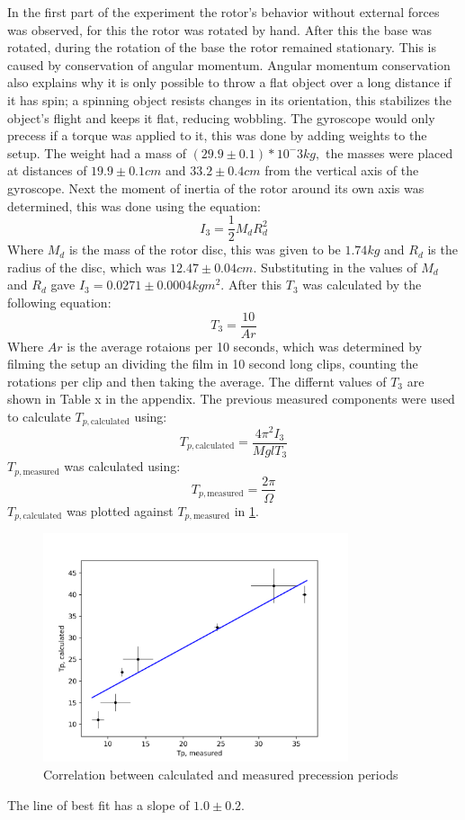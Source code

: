 In the first part of the experiment the rotor’s behavior without external forces was observed, for this the rotor was rotated by hand. After this the base was rotated, during the rotation of the base the rotor remained stationary. This is caused by conservation of angular momentum. Angular momentum conservation also explains why it is only possible to throw a flat object over a long distance if it has spin; a spinning object resists changes in its orientation, this stabilizes the object's flight and keeps it flat, reducing wobbling.
The gyroscope would only precess if a torque was applied to it, this was done by adding weights to the setup. The weight had a mass of $(29.9 \pm 0.1)*10^-3 kg,$ the masses were placed at distances of $19.9 \pm 0.1 cm$ and $33.2 \pm 0.4 cm$ from the vertical axis of the gyroscope.
Next the moment of inertia of the rotor around its own axis was determined, this was done using the equation:
\begin{equation*}
    I_3 = \frac{1}{2} M_d R_d^2
\end{equation*}
Where $M_d$ is the mass of the rotor disc, this was given to be $1.74 kg$ and $R_d$ is the radius of the disc, which was $12.47 \pm 0.04 cm$. Substituting in the values of $M_d$ and $R_d$ gave $I_3 = 0.0271 \pm 0.0004 kgm^2$. After this $T_3$ was calculated by the following equation:
\begin{equation*}
    T_3 = \frac{10}{Ar}
\end{equation*}
Where $Ar$ is the average rotaions per 10 seconds, which was determined by filming the setup an dividing the film in 10 second long clips, counting the rotations per clip and then taking the average. The differnt values of $T_3$ are shown in Table x in the appendix. The previous measured components were used to calculate $T_{p, \text{calculated}}$ using:
\begin{equation*}
    T_{p, \text{calculated}} = \frac{4\pi^2I_3}{MglT_3}
\end{equation*}
$T_{p, \text{measured}}$ was calculated using:
\begin{equation*}
    T_{p, \text{measured}} = \frac{2\pi}{\Omega}
\end{equation*}
$T_{p, \text{calculated}}$ was plotted against $T_{p, \text{measured}}$ in \ref{fig:gyro}.

\begin{figure}[h!]
    \centering
    \includegraphics[width=0.8\textwidth]{gyroscope/images/gyro}
    \caption{Correlation between calculated and measured precession periods}
    \label{fig:gyro}
\end{figure}

The line of best fit has a slope of $1.0 \pm 0.2$.

